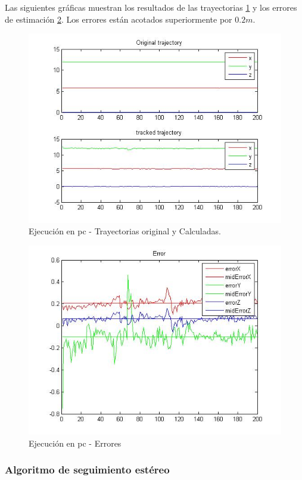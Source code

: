 	Las siguientes gr\'aficas muestran los resultados de las trayectorias \ref{fig:trajectories_PC} y los errores de estimaci\'on   \ref{fig:errors_PC}. Los errores est\'an acotados superiormente por $0.2 m$.
	
	\begin{figure}[hp]
		\centering
		\includegraphics[width=0.75\linewidth]{../Images/c4/trajs}
		\caption{Ejecuci\'on en pc - Trayectorias original y Calculadas.}
		\label{fig:trajectories_PC}
	\end{figure}
	
	\begin{figure}[hp]
		\centering
		\includegraphics[width=0.5\linewidth]{../Images/c4/errors}
		\caption{Ejecuci\'on en pc - Errores}
		\label{fig:errors_PC}
	\end{figure}
	
	\newpage
	
		
	\subsubsection{Algoritmo de seguimiento est\'ereo}
	
